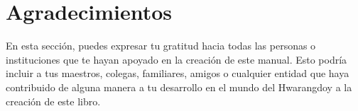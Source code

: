 \chapter*{Agradecimientos}

En esta sección, puedes expresar tu gratitud hacia todas las personas o instituciones que te hayan apoyado en la creación de este manual. Esto podría incluir a tus maestros, colegas, familiares, amigos o cualquier entidad que haya contribuido de alguna manera a tu desarrollo en el mundo del Hwarangdo\textregistered y a la creación de este libro.